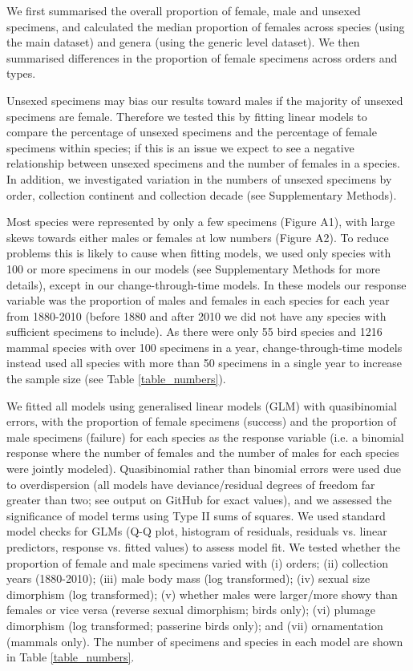 \documentclass[a4paper, 12pt]{article}
\begin{document}
We first summarised the overall proportion of female, male and unsexed specimens, and calculated the median proportion of females across species (using the main dataset) and genera (using the generic level dataset). 
We then summarised differences in the proportion of female specimens across orders and types. 

Unsexed specimens may bias our results toward males if the majority of unsexed specimens are female. 
Therefore we tested this by fitting linear models to compare the percentage of unsexed specimens and the percentage of female specimens within species; if this is an issue we expect to see a negative relationship between unsexed specimens and the number of females in a species. 
In addition, we investigated variation in the numbers of unsexed specimens by order, collection continent and collection decade (see Supplementary Methods).

Most species were represented by only a few specimens (Figure A1), with large skews towards either males or females at low numbers (Figure A2). 
To reduce problems this is likely to cause when fitting models, we used only species with 100 or more specimens in our models (see Supplementary Methods for more details), except in our change-through-time models. 
In these models our response variable was the proportion of males and females in each species for each year from 1880-2010 (before 1880 and after 2010 we did not have any species with sufficient specimens to include). 
As there were only 55 bird species and 1216 mammal species with over 100 specimens in a year, change-through-time models instead used all species with more than 50 specimens in a single year to increase the sample size (see Table \ref{table_numbers}).

We fitted all models using generalised linear models (GLM) with quasibinomial errors, with the proportion of female specimens (success) and the proportion of male specimens (failure) for each species as the response variable (i.e. a binomial response where the number of females and the number of males for each species were jointly modeled). 
Quasibinomial rather than binomial errors were used due to overdispersion (all models have deviance/residual degrees of freedom far greater than two; see output on GitHub for exact values), and we assessed the significance of model terms using Type II sums of squares. 
We used standard model checks for GLMs (Q-Q plot, histogram of residuals, residuals vs. linear predictors, response vs. fitted values) to assess model fit. 
We tested whether the proportion of female and male specimens varied with (i) orders; (ii) collection years (1880-2010); (iii) male body mass (log transformed); (iv) sexual size dimorphism (log transformed); (v) whether males were larger/more showy than females or vice versa (reverse sexual dimorphism; birds only); (vi) plumage dimorphism (log transformed; passerine birds only); and (vii) ornamentation (mammals only). 
The number of specimens and species in each model are shown in Table \ref{table_numbers}.
\end{document}
